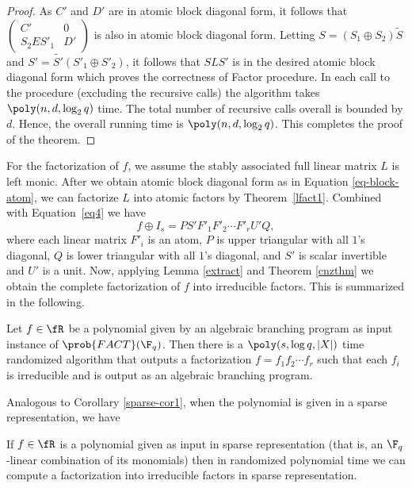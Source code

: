 \begin{proof}
As $C'$ and $D'$ are in atomic block diagonal form, it follows that
$\left(
\begin{array}{cc}
C' & 0 \\
S_2ES'_1 & D'
\end{array}
\right)$ is also in atomic block diagonal form. Letting $S=(S_1 \oplus
S_2) \tilde{S}$ and $S'=\tilde{S'}(S'_1 \oplus S'_2)$, it follows that
$SLS'$ is in the desired atomic block diagonal form which proves the
correctness of Factor procedure. In each call to the procedure
(excluding the recursive calls) the algorithm takes
$\poly(n,d,\log_2q)$ time. The total number of recursive calls overall
is bounded by $d$. Hence, the overall running time is
$\poly(n,d,\log_2q)$. This completes the proof of the theorem.
\end{proof}

For the factorization of $f$, we assume the stably associated full
linear matrix $L$ is left monic. After we obtain atomic block
diagonal form as in Equation \ref{eq-block-atom}, we can factorize $L$
into atomic factors by Theorem~\ref{lfact1}. Combined with
Equation~\ref{eq4} we have
\begin{equation*}
f\oplus I_s = PS'F'_1F'_2\cdots F'_r U'Q,
\end{equation*}
where each linear matrix $F'_i$ is an atom, $P$ is upper triangular
with all $1$'s diagonal, $Q$ is lower triangular with all $1$'s
diagonal, and $S'$ is scalar invertible and $U'$ is a unit. Now,
applying Lemma \ref{extract} and Theorem \ref{cnzthm} we obtain the
complete factorization of $f$ into irreducible factors. This is
summarized in the following.

\begin{theorem}\label{comzthm}  
  Let $f\in \fR$ be a polynomial given by an algebraic branching
  program as input instance of $\prob{FACT}(\F_q)$. Then there is a
  $\poly(s, \log q,|X|)$ time randomized algorithm that outputs a
  factorization $f=f_1f_2\cdots f_r$ such that each $f_i$ is
  irreducible and is output as an algebraic branching program.
\end{theorem}

Analogous to Corollary \ref{sparse-cor1}, when the polynomial is given
in a sparse representation, we have 

\begin{corollary} \label{sparse-comnz}
If $f\in\fR$ is a polynomial given as input in sparse representation
(that is, an $\F_q$-linear combination of its monomials) then in
randomized polynomial time we can compute a factorization into
irreducible factors in sparse representation.
\end{corollary}

